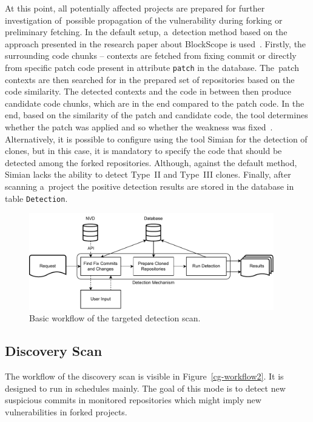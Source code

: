   At this point, all potentially affected projects are prepared for further investigation of~possible
  propagation of the vulnerability during forking or preliminary fetching. In the default setup, a~detection
  method based on the approach presented in the research paper about BlockScope is used~\cite{BlockScope}. Firstly,
  the surrounding code chunks -- contexts are fetched from fixing commit or directly from specific patch code
  present in attribute \texttt{patch} in the database. The~patch contexts are then searched for in the prepared
  set of repositories based on the code similarity. The detected contexts and the code in between then produce
  candidate code chunks, which are in the end compared to the patch code. In the end, based on the similarity
  of the patch and candidate code, the tool determines whether the patch was applied and so whether the weakness
  was fixed~\cite{BlockScope}. Alternatively, it is possible to configure using the tool Simian for the detection
  of clones, but in this case, it is mandatory to specify the code that should be detected among the forked repositories.
  Although, against the default method, Simian lacks the ability to detect Type~II and Type~III clones.
  Finally, after scanning a~project the positive detection results are stored in the database in table \texttt{Detection}.

  \begin{figure}[h]
    \centering
    \includegraphics[width=0.95\textwidth]{obrazky-figures/cloneguard_workflow1.drawio.pdf}
    \caption{Basic workflow of the targeted detection scan.}
    \label{cg-workflow1}
  \end{figure}

  \subsection*{Discovery Scan}
  The workflow of the discovery scan is visible in Figure~\ref{cg-workflow2}. It is designed to run in schedules mainly.
  The goal of this mode is to detect new suspicious commits in monitored repositories which might imply
  new vulnerabilities in forked projects.

